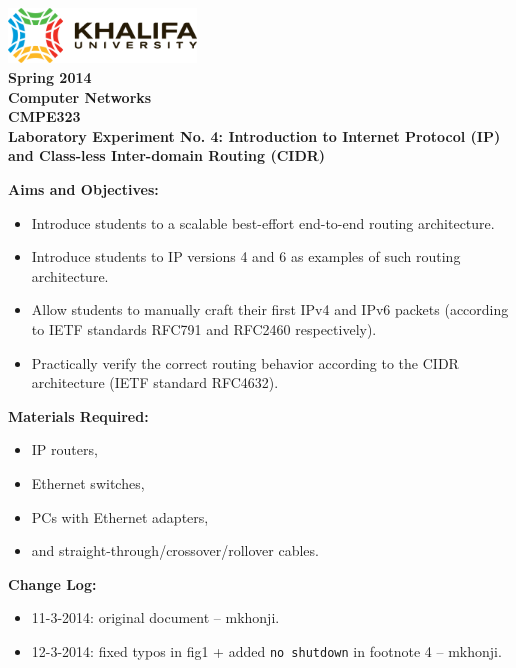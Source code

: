 \documentclass[pdftex,12pt,a4paper]{article}
\begin{document}
    \begin{titlepage}
        \begin{center}
            \includegraphics[width=5cm]{figures/kulogo}\\[1cm]
            {\Large \bfseries
                Spring 2014\\
                Computer Networks\\
                CMPE323\\[1cm]
            }
            {\large \bfseries
                \noindent Laboratory Experiment No. 4: Introduction to Internet
                Protocol (IP) and Class-less Inter-domain Routing (CIDR)\\[1cm]
            }
        \end{center}

        \noindent \textbf{Aims and Objectives:}
            \begin{itemize}[leftmargin=4cm]
                \item Introduce students to a scalable best-effort end-to-end
                    routing architecture.
                \item Introduce students to IP versions 4 and 6 as examples of
                    such routing architecture.
                \item Allow students to manually craft their first IPv4 and
                    IPv6 packets (according to IETF standards RFC791 and RFC2460
                    respectively).
                \item Practically verify the correct routing
                    behavior according to the CIDR architecture (IETF standard
                    RFC4632).
            \end{itemize}
            \vspace{0.5cm}

        \noindent \textbf{Materials Required:}
            \begin{itemize}[leftmargin=4cm]
                \item IP routers,
                \item Ethernet switches,
                \item PCs with Ethernet adapters,
                \item and straight-through/crossover/rollover cables.
            \end{itemize}
            \vspace{0.5cm}

        \noindent \textbf{Change Log:}
            \begin{itemize}[leftmargin=4cm]
                \item 11-3-2014: original document -- mkhonji.
                \item 12-3-2014: fixed typos in fig1 + added \texttt{no
                    shutdown} in footnote 4 -- mkhonji.
            \end{itemize}
    \end{titlepage}
    \newpage
\end{document}
